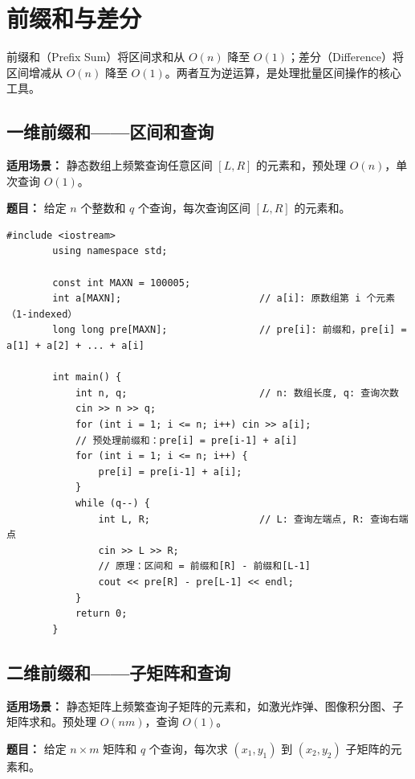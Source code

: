 \documentclass[12pt,a4paper]{ctexart}
\begin{document}
	\newpage
	
	\section{前缀和与差分}
	前缀和（Prefix Sum）将区间求和从 $O(n)$ 降至 $O(1)$；差分（Difference）将区间增减从 $O(n)$ 降至 $O(1)$。两者互为逆运算，是处理批量区间操作的核心工具。
	
	\subsection{一维前缀和——区间和查询}
	\textbf{适用场景：} 静态数组上频繁查询任意区间 $[L,R]$ 的元素和，预处理 $O(n)$，单次查询 $O(1)$。
	
	\textbf{题目：} 给定 $n$ 个整数和 $q$ 个查询，每次查询区间 $[L,R]$ 的元素和。
	
	\begin{lstlisting}[caption={一维前缀和——O(1) 区间和查询}]
		#include <iostream>
		using namespace std;
		
		const int MAXN = 100005;
		int a[MAXN];                        // a[i]: 原数组第 i 个元素（1-indexed）
		long long pre[MAXN];                // pre[i]: 前缀和，pre[i] = a[1] + a[2] + ... + a[i]
		
		int main() {
			int n, q;                       // n: 数组长度, q: 查询次数
			cin >> n >> q;
			for (int i = 1; i <= n; i++) cin >> a[i];
			// 预处理前缀和：pre[i] = pre[i-1] + a[i]
			for (int i = 1; i <= n; i++) {
				pre[i] = pre[i-1] + a[i];
			}
			while (q--) {
				int L, R;                   // L: 查询左端点, R: 查询右端点
				cin >> L >> R;
				// 原理：区间和 = 前缀和[R] - 前缀和[L-1]
				cout << pre[R] - pre[L-1] << endl;
			}
			return 0;
		}
	\end{lstlisting}
	
	\subsection{二维前缀和——子矩阵和查询}
	\textbf{适用场景：} 静态矩阵上频繁查询子矩阵的元素和，如激光炸弹、图像积分图、子矩阵求和。预处理 $O(nm)$，查询 $O(1)$。
	
	\textbf{题目：} 给定 $n \times m$ 矩阵和 $q$ 个查询，每次求 $(x_1,y_1)$ 到 $(x_2,y_2)$ 子矩阵的元素和。
	
\end{document}
